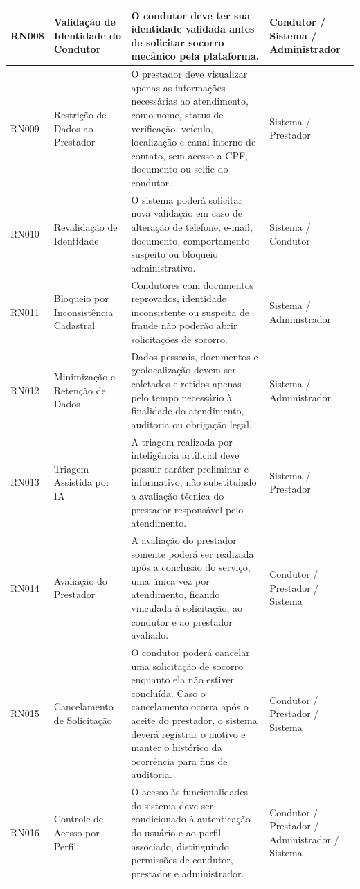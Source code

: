 \documentclass[12pt, a4paper]{article}
\begin{document}
{\begin{longtable}{|>{\raggedright\arraybackslash}p{}|>{\raggedright\arraybackslash}p{}|>{\raggedright\arraybackslash}p{}|>{\raggedright\arraybackslash}p{}|}
RN008 & Validação de Identidade do Condutor & O condutor deve ter sua identidade validada antes de solicitar socorro mecânico pela plataforma. & Condutor / Sistema / Administrador \\ \hline
RN009 & Restrição de Dados ao Prestador & O prestador deve visualizar apenas as informações necessárias ao atendimento, como nome, status de verificação, veículo, localização e canal interno de contato, sem acesso a CPF, documento ou selfie do condutor. & Sistema / Prestador \\ \hline
RN010 & Revalidação de Identidade & O sistema poderá solicitar nova validação em caso de alteração de telefone, e-mail, documento, comportamento suspeito ou bloqueio administrativo. & Sistema / Condutor \\ \hline
RN011 & Bloqueio por Inconsistência Cadastral & Condutores com documentos reprovados, identidade inconsistente ou suspeita de fraude não poderão abrir solicitações de socorro. & Sistema / Administrador \\ \hline
RN012 & Minimização e Retenção de Dados & Dados pessoais, documentos e geolocalização devem ser coletados e retidos apenas pelo tempo necessário à finalidade do atendimento, auditoria ou obrigação legal. & Sistema / Administrador \\ \hline
RN013 & Triagem Assistida por IA & A triagem realizada por inteligência artificial deve possuir caráter preliminar e informativo, não substituindo a avaliação técnica do prestador responsável pelo atendimento. & Sistema / Prestador \\ \hline
RN014 & Avaliação do Prestador & A avaliação do prestador somente poderá ser realizada após a conclusão do serviço, uma única vez por atendimento, ficando vinculada à solicitação, ao condutor e ao prestador avaliado. & Condutor / Prestador / Sistema \\ \hline
RN015 & Cancelamento de Solicitação & O condutor poderá cancelar uma solicitação de socorro enquanto ela não estiver concluída. Caso o cancelamento ocorra após o aceite do prestador, o sistema deverá registrar o motivo e manter o histórico da ocorrência para fins de auditoria. & Condutor / Prestador / Sistema \\ \hline
RN016 & Controle de Acesso por Perfil & O acesso às funcionalidades do sistema deve ser condicionado à autenticação do usuário e ao perfil associado, distinguindo permissões de condutor, prestador e administrador. & Condutor / Prestador / Administrador / Sistema \\ \hline
\end{longtable}
}
\end{document}
